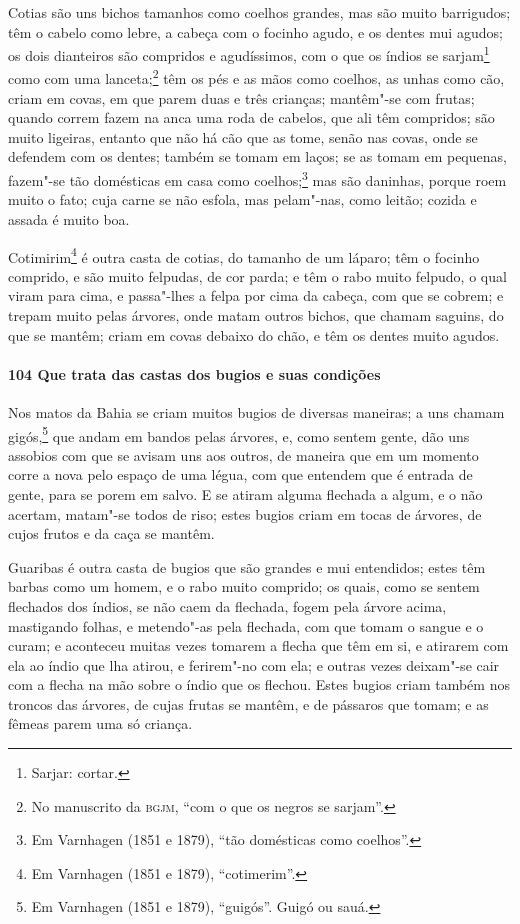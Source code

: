 \begin{linenumbers}
Cotias são uns bichos tamanhos como coelhos grandes, mas são muito barrigudos; têm o
cabelo como lebre, a cabeça com o focinho agudo, e os dentes mui agudos; os dois
dianteiros são compridos e agudíssimos, com o que os índios se sarjam\footnote{ Sarjar:
cortar.} como com uma lanceta;\footnote{ No manuscrito da \textsc{bgjm}, ``com o que os
negros se sarjam''.} têm os pés e as mãos como coelhos, as unhas como cão, criam em covas,
em que parem duas e três crianças; mantêm"-se com frutas; quando correm fazem na anca uma
roda de cabelos, que ali têm compridos; são muito ligeiras, entanto que não há cão que as
tome, senão nas covas, onde se defendem com os dentes; também se tomam em laços; se as
tomam em pequenas, fazem"-se tão domésticas em casa como coelhos;\footnote{ Em Varnhagen
(1851 e 1879), ``tão domésticas como coelhos''.} mas são daninhas, porque roem muito o
fato; cuja carne se não esfola, mas pelam"-nas, como leitão; cozida e assada é muito boa.

Cotimirim\footnote{ Em Varnhagen (1851 e 1879), ``cotimerim''.} é outra casta de cotias,
do tamanho de um láparo; têm o focinho comprido, e são muito felpudas, de cor parda; e têm
o rabo muito felpudo, o qual viram para cima, e passa"-lhes a felpa por cima da cabeça, com
que se cobrem; e trepam muito pelas árvores, onde matam outros bichos, que chamam saguins,
do que se mantêm; criam em covas debaixo do chão, e têm os dentes muito agudos.

\paragraph{104 Que trata das castas dos bugios e suas condições}\quad
Nos matos da Bahia se criam muitos bugios de diversas maneiras; a uns chamam
gigós,\footnote{ Em Varnhagen (1851 e 1879), ``guigós''. Guigó ou sauá.} que andam em
bandos pelas árvores, e, como sentem gente, dão uns assobios com que se avisam uns aos
outros, de maneira que em um momento corre a nova pelo espaço de uma légua, com que
entendem que é entrada de gente, para se porem em salvo. E se atiram alguma flechada a
algum, e o não acertam, matam"-se todos de riso; estes bugios criam em tocas de árvores, de
cujos frutos e da caça se mantêm.

Guaribas é outra casta de bugios que são grandes e mui entendidos; estes têm barbas como
um homem, e o rabo muito comprido; os quais, como se sentem flechados dos índios, se não
caem da flechada, fogem pela árvore acima, mastigando folhas, e metendo"-as pela flechada,
com que tomam o sangue e o curam; e aconteceu muitas vezes tomarem a flecha que têm em si,
e atirarem com ela ao índio que lha atirou, e ferirem"-no com ela; e outras vezes deixam"-se
cair com a flecha na mão sobre o índio que os flechou. Estes bugios criam também nos
troncos das árvores, de cujas frutas se mantêm, e de pássaros que tomam; e as fêmeas parem
uma só criança.


\end{linenumbers}
